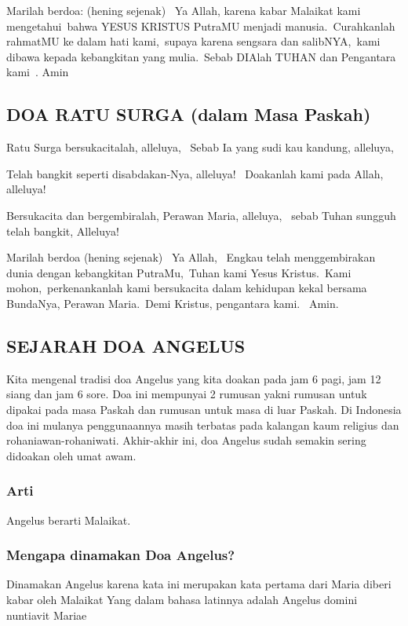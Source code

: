 \documentclass{article}
\begin{document}
Marilah berdoa: (hening sejenak)~ Ya Allah, karena kabar Malaikat kami
mengetahui~bahwa YESUS KRISTUS PutraMU menjadi manusia.~Curahkanlah
rahmatMU ke dalam hati kami,~supaya karena sengsara dan salibNYA,~kami
dibawa kepada kebangkitan yang mulia.~Sebab DIAlah TUHAN dan Pengantara
kami~.  Amin~

\subsection[DOA RATU SURGA (dalam Masa Paskah)]{DOA RATU SURGA (dalam
Masa Paskah)}
Ratu Surga bersukacitalah, alleluya,~ Sebab Ia yang sudi kau kandung,
alleluya,~

 Telah bangkit seperti disabdakan-Nya, alleluya!~ Doakanlah kami pada
Allah, alleluya!~

 Bersukacita dan bergembiralah, Perawan Maria, alleluya,~ sebab Tuhan
sungguh telah bangkit, Alleluya!~

Marilah berdoa (hening sejenak)~ Ya Allah,~ Engkau telah menggembirakan
dunia dengan kebangkitan PutraMu,~Tuhan kami Yesus Kristus.~Kami
mohon,~perkenankanlah kami bersukacita dalam kehidupan kekal bersama
BundaNya, Perawan Maria.~Demi Kristus, pengantara kami.~ Amin.

\subsection[SEJARAH DOA ANGELUS]{SEJARAH DOA ANGELUS}
Kita mengenal tradisi doa Angelus yang kita doakan pada jam 6 pagi, jam
12 siang dan jam 6 sore. Doa ini mempunyai 2 rumusan yakni rumusan
untuk dipakai pada masa Paskah dan rumusan untuk masa di luar Paskah.
Di Indonesia doa ini mulanya penggunaannya masih terbatas pada kalangan
kaum religius dan rohaniawan-rohaniwati. Akhir-akhir ini, doa Angelus
sudah semakin sering didoakan oleh umat awam.

\subsubsection[Arti]{Arti}
{\textquotedbl}Angelus{\textquotedbl} berarti
{\textquotedbl}Malaikat{\textquotedbl}.

\subsubsection[Mengapa dinamakan Doa Angelus?]{Mengapa dinamakan Doa
Angelus?}
Dinamakan Angelus karena kata ini merupakan kata pertama dari
{\textquotedbl}Maria diberi kabar oleh Malaikat{\textquotedbl} Yang
dalam bahasa latinnya adalah {\textquotedbl}Angelus domini nuntiavit
Mariae{\textquotedbl}
\end{document}
